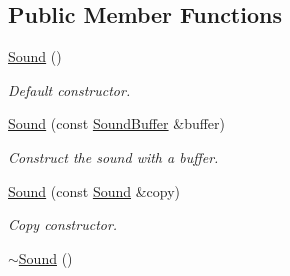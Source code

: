 \subsection*{Public Member Functions}
\begin{DoxyCompactItemize}
\item 
\hypertarget{classsf_1_1Sound_a36ab74beaaa953d9879c933ddd246282}{\hyperlink{classsf_1_1Sound_a36ab74beaaa953d9879c933ddd246282}{Sound} ()}\label{classsf_1_1Sound_a36ab74beaaa953d9879c933ddd246282}

\begin{DoxyCompactList}\small\item\em Default constructor. \end{DoxyCompactList}\item 
\hyperlink{classsf_1_1Sound_a3b1cfc19a856d4ff8c079ee41bb78e69}{Sound} (const \hyperlink{classsf_1_1SoundBuffer}{Sound\-Buffer} \&buffer)
\begin{DoxyCompactList}\small\item\em Construct the sound with a buffer. \end{DoxyCompactList}\item 
\hyperlink{classsf_1_1Sound_ae05eeed6377932694d86b3011be366c0}{Sound} (const \hyperlink{classsf_1_1Sound}{Sound} \&copy)
\begin{DoxyCompactList}\small\item\em Copy constructor. \end{DoxyCompactList}\item 
\hypertarget{classsf_1_1Sound_ad0792c35310eba2dffd8489c80fad076}{\hyperlink{classsf_1_1Sound_ad0792c35310eba2dffd8489c80fad076}{$\sim$\-Sound} ()}\label{classsf_1_1Sound_ad0792c35310eba2dffd8489c80fad076}


\end{DoxyCompactItemize}
